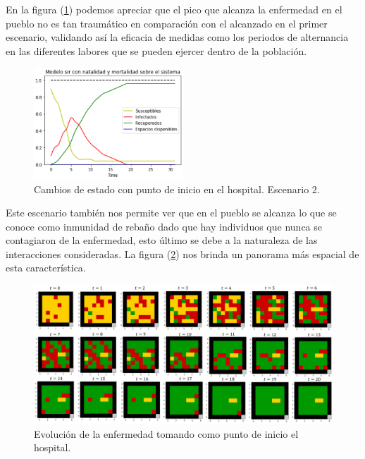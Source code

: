 En la figura (\ref{fig:metricas2}) podemos apreciar que el pico que alcanza la enfermedad en el pueblo no es tan traumático en comparación con el alcanzado en el primer escenario, validando así la eficacia de medidas como los periodos de alternancia en las diferentes labores que se pueden ejercer dentro de la población.

\newpage

\begin{figure}[h]
  \centering
    \includegraphics[width=0.5\textwidth]{Imagenes/metricas2.PNG}
    \caption{Cambios de estado con punto de inicio en el hospital. Escenario 2.}
    \label{fig:metricas2}
\end{figure}

Este escenario también nos permite ver que en el pueblo se alcanza lo que se conoce como inmunidad de rebaño dado que hay individuos que nunca se contagiaron de la enfermedad, esto último se debe a la naturaleza de las interacciones consideradas. La figura (\ref{fig:evo2}) nos brinda un panorama más espacial de esta característica.

\begin{figure}[h]
  \centering
    \includegraphics[width=1.05\textwidth]{Imagenes/evo2.PNG}
    \caption{Evolución de la enfermedad tomando como punto de inicio el hospital.}
    \label{fig:evo2}
\end{figure}

